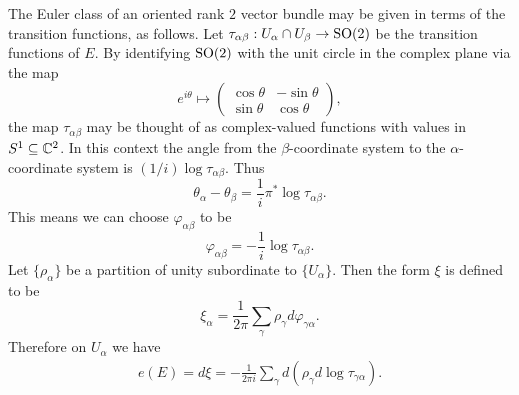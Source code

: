 The Euler class of an oriented rank $2$ vector bundle may be given in terms of the transition functions, as follows. Let 
$\tau_{\alpha\beta}:U_\alpha\cap U_\beta\to\mathrm{SO}(2)$ be the transition functions of $E$. By identifying $\mathrm{SO}(2)$ with the unit circle in the complex plane via the map 
\[e^{i\theta}\mapsto\begin{pmatrix}
\cos\theta&-\sin\theta\\
\sin\theta&\cos\theta
\end{pmatrix},\]
the map $\tau_{\alpha\beta}$ may be thought of as complex-valued functions with values in $S^1\subseteq\mathbb{C}^2$. In this context the angle from the $\beta$-coordinate system 
to the $\alpha$-coordinate system is $(1/i)\log\tau_{\alpha\beta}$. Thus
\[\theta_\alpha-\theta_\beta=\frac{1}{i}\pi^*\log\tau_{\alpha\beta}.\]
This means we can choose $\varphi_{\alpha\beta}$ to be
\[\varphi_{\alpha\beta}=-\frac{1}{i}\log\tau_{\alpha\beta}.\]
Let $\{\rho_\alpha\}$ be a partition of unity subordinate to $\{U_\alpha\}$. Then the form $\xi$ is defined to be
\[\xi_\alpha=\frac{1}{2\pi}\sum_{\gamma}\rho_\gamma d\varphi_{\gamma\alpha}.\]
Therefore on $U_\alpha$ we have
\begin{align}\label{Euler class rank 2 transition}
e(E)=d\xi=-\frac{1}{2\pi i}\sum_{\gamma}d(\rho_\gamma d\log\tau_{\gamma\alpha}).
\end{align}
